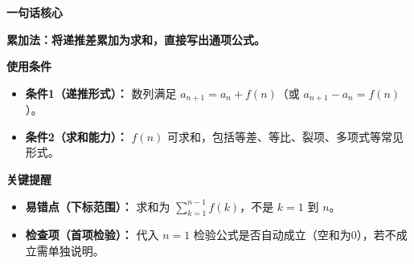 \begin{summarybox}
	\textbf{\textcolor{CSummary}{一句话核心}}

	\textbf{累加法：将递推差累加为求和，直接写出通项公式。}

	\medskip
	\textbf{\textcolor{CSummary}{使用条件}}
	\begin{itemize}[leftmargin=*, itemsep=0.5em, topsep=0.4em]
		\item \textbf{条件1（递推形式）：} 数列满足 $a_{n+1}=a_n+f(n)$（或 $a_{n+1}-a_n=f(n)$）。
		\item \textbf{条件2（求和能力）：} $f(n)$ 可求和，包括等差、等比、裂项、多项式等常见形式。
	\end{itemize}

	\medskip
	\textbf{\textcolor{CSummary}{关键提醒}}
	\begin{itemize}[leftmargin=*, itemsep=0.5em, topsep=0.4em]
		\item \textbf{易错点（下标范围）：} 求和为 $\sum_{k=1}^{n-1} f(k)$，不是 $k=1$ 到 $n$。
		\item \textbf{检查项（首项检验）：} 代入 $n=1$ 检验公式是否自动成立（空和为0），若不成立需单独说明。
	\end{itemize}
\end{summarybox}
